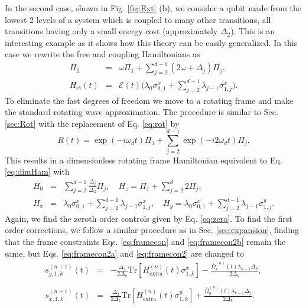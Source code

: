 \documentclass[pra,twocolumn,floatfix,superscriptaddress,eqsecnum]{revtex4-1}
\begin{document}
In the second case, shown in Fig. \ref{fig:Ext} (b), we consider a qubit made from the lowest 2 levels of a system which is coupled to many other transitions, all transitions having only a small energy cost (approximately $\Delta_2$).   This is an interesting example as it shows how this theory can be easily generalized.
In this case we rewrite the free and coupling Hamiltonians as
\begin{eqnarray}
    H_\mathrm{fr}&=&\omega\Pi_1+\sum_{j=2}^{d-1}(2\omega+\Delta_j)\Pi_j,\\
H_\mathrm{ct}(t)&=&\mathcal{E}(t)\bigg(\lambda_0\sigma^x_{0,1}+\sum_{j=2}^{d-1}\lambda_{j-1}\sigma^x_{1,j}\bigg).
\label{eq:hamiltonianC}\end{eqnarray} 
To eliminate the fast degrees of freedom we move to a rotating frame and make the standard rotating wave approximation. The procedure is similar to Sec. \ref{sec:Rot} with the replacement of  Eq. \eqref{eq:rot} by
\begin{equation}
 R(t)=\exp\left(-i \omega_d t \right)\Pi_1+\sum_{j=2}^{d-1}\exp\left(-i 2\omega_d t \right)\Pi_j.
\end{equation} This results in a dimensionless rotating frame Hamiltonian equivalent to Eq. \eqref{eq:dimHam} with
\begin{eqnarray}
H_0 &=& \sum_{j=2}^{d-1} \frac{\Delta_j}{\Delta_2}\Pi_j,\quad
H_z = \Pi_1+\sum_{j=2}^{d} 2\Pi_j,\nonumber\\
H_x &=& \lambda_0\sigma^x_{0,1}+\sum_{j=2}^{d-1}\lambda_{j-1}\sigma^x_{1,j}, \quad
H_y = \lambda_0\sigma^x_{0,1}+\sum_{j=2}^{d-1}\lambda_{j-1}\sigma^y_{1,j}.\nonumber
\end{eqnarray} Again, we find the zeroth order controls given by Eq. \eqref{eq:zero}.  To find the first order corrections, we follow a similar procedure as in Sec. \ref{sec:expansion}, finding that the frame constraints Eqs. \eqref{eq:framecon} and \eqref{eq:framecon2b} remain the same, but Eqs. \eqref{eq:framecon2a} and \eqref{eq:framecon2}  are changed to
\begin{eqnarray}
s^{(n+1)}_{y,1,k}(t)&=&-\frac{\Delta_2}{2 \Delta_k}\mathrm{Tr}[{H}_\mathrm{extra}^{(n)} (t)\sigma^x_{1,k}]-\frac{\bar\Omega_x^{(n)}(t)\lambda_{k-1}\Delta_2}{2\Delta_k},\nonumber\\\\
s^{(n+1)}_{x,1,k}(t)&=&\frac{\Delta_2}{2 \Delta_k}\mathrm{Tr}[{H}_\mathrm{extra}^{(n)}(t)\sigma^y_{1,k}]+\frac{\bar\Omega_y^{(n)}(t)\lambda_{k-1}\Delta_2}{2\Delta_k}. \nonumber\\
\end{eqnarray}
\end{document}
